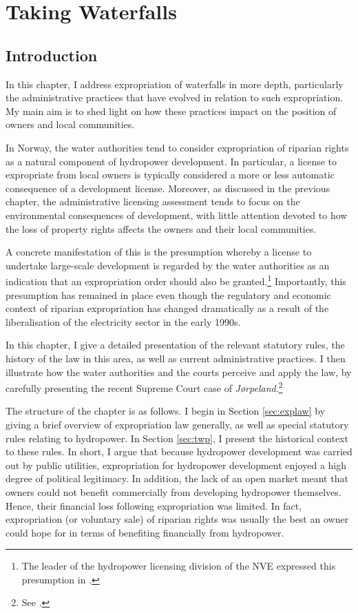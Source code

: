 \chapter{Taking Waterfalls}\label{chap:4}

\section{Introduction}\label{sec:intro4}

In this chapter, I address expropriation of waterfalls in more depth, particularly the administrative practices that have evolved in relation to such expropriation. My main aim is to shed light on how these practices impact on the position of owners and local communities.

In Norway, the water authorities tend to consider expropriation of riparian rights as a natural component of hydropower development. In particular, a license to expropriate from local owners is typically considered a more or less automatic consequence of a development license. Moreover, as discussed in the previous chapter, the administrative licensing assessment tends to focus on the environmental consequences of development, with little attention devoted to how the loss of property rights affects the owners and their local communities.

A concrete manifestation of this is the presumption whereby a license to undertake large-scale development is regarded by the water authorities as an indication that an expropriation order should also be granted.\footnote{The leader of the hydropower licensing division of the NVE expressed this presumption in  \cite{flatby08}.} Importantly, this presumption has remained in place even though the regulatory and economic context of riparian expropriation has changed dramatically as a result of the liberalisation of the electricity sector in the early 1990s. 

In this chapter, I give a detailed presentation of the relevant statutory rules, the history of the law in this area, as well as current administrative practices. I then illustrate how the water authorities and the courts perceive and apply the law, by carefully presenting the recent Supreme Court case of {\it Jørpeland}.\footnote{See \cite{jorpeland11}.}

The structure of the chapter is as follows. I begin in Section \ref{sec:explaw} by giving a brief overview of expropriation law generally, as well as special statutory rules relating to hydropower. In Section \ref{sec:twp}, I present the historical context to these rules. In short, I argue that because hydropower development was carried out by public utilities, expropriation for hydropower development enjoyed a high degree of political legitimacy. In addition, the lack of an open market meant that owners could not benefit commercially from developing hydropower themselves. Hence, their financial loss following expropriation was limited. In fact, expropriation (or voluntary sale) of riparian rights was usually the best an owner could hope for in terms of benefiting financially from hydropower.

